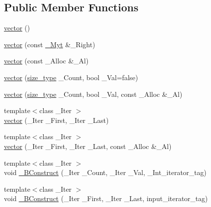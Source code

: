\subsection*{Public Member Functions}
\begin{DoxyCompactItemize}
\item 
\hyperlink{classvector_3_01___bool_00_01___alloc_01_4_afd4c7f3332d8ebdd70049f8a5d262b58}{vector} ()
\item 
\hyperlink{classvector_3_01___bool_00_01___alloc_01_4_ab48c3b5446e5fc35dfe20f58f75813bc}{vector} (const \hyperlink{classvector_3_01___bool_00_01___alloc_01_4_ada353b682f03c458260a7f7cf361d465}{\+\_\+\+Myt} \&\+\_\+\+Right)
\item 
\hyperlink{classvector_3_01___bool_00_01___alloc_01_4_a35a7cae1b0ce66a2cb6efe078d9724ec}{vector} (const \+\_\+\+Alloc \&\+\_\+\+Al)
\item 
\hyperlink{classvector_3_01___bool_00_01___alloc_01_4_ad905fdd366a0d208d5d1691d42062276}{vector} (\hyperlink{class___vb__val_aae6aa10bcd41d235b46f128df1198612}{size\+\_\+type} \+\_\+\+Count, bool \+\_\+\+Val=false)
\item 
\hyperlink{classvector_3_01___bool_00_01___alloc_01_4_a1704244314427d71196810f7464f7a64}{vector} (\hyperlink{class___vb__val_aae6aa10bcd41d235b46f128df1198612}{size\+\_\+type} \+\_\+\+Count, bool \+\_\+\+Val, const \+\_\+\+Alloc \&\+\_\+\+Al)
\item 
{\footnotesize template$<$class \+\_\+\+Iter $>$ }\\\hyperlink{classvector_3_01___bool_00_01___alloc_01_4_a22dd8a5a28d58044c0cf7d3f6afca43f}{vector} (\+\_\+\+Iter \+\_\+\+First, \+\_\+\+Iter \+\_\+\+Last)
\item 
{\footnotesize template$<$class \+\_\+\+Iter $>$ }\\\hyperlink{classvector_3_01___bool_00_01___alloc_01_4_aa63b6633740c58b97313a6b5cf65cece}{vector} (\+\_\+\+Iter \+\_\+\+First, \+\_\+\+Iter \+\_\+\+Last, const \+\_\+\+Alloc \&\+\_\+\+Al)
\item 
{\footnotesize template$<$class \+\_\+\+Iter $>$ }\\void \hyperlink{classvector_3_01___bool_00_01___alloc_01_4_a46790e35a277143c9539d0cb3d3153aa}{\+\_\+\+B\+Construct} (\+\_\+\+Iter \+\_\+\+Count, \+\_\+\+Iter \+\_\+\+Val, \+\_\+\+Int\+\_\+iterator\+\_\+tag)
\item 
{\footnotesize template$<$class \+\_\+\+Iter $>$ }\\void \hyperlink{classvector_3_01___bool_00_01___alloc_01_4_a383643e134283429ec3038cd91252fab}{\+\_\+\+B\+Construct} (\+\_\+\+Iter \+\_\+\+First, \+\_\+\+Iter \+\_\+\+Last, input\+\_\+iterator\+\_\+tag)

\end{DoxyCompactItemize}
